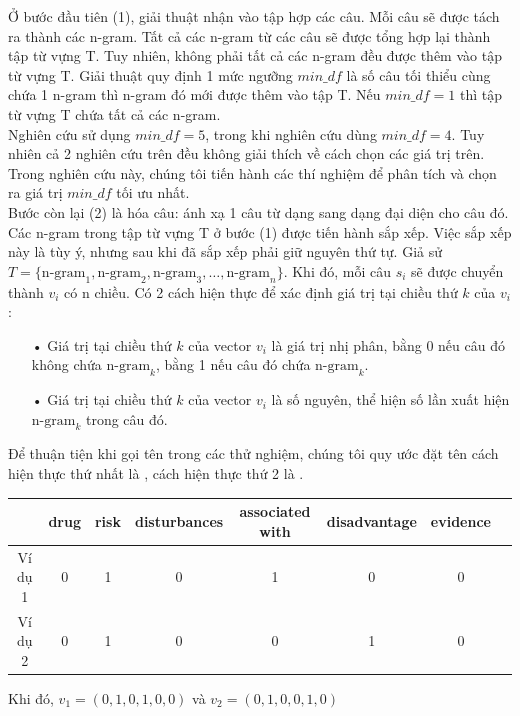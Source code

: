 Ở bước đầu tiên (1), giải thuật nhận vào tập hợp các câu. Mỗi câu sẽ được tách ra thành các n-gram. Tất cả các n-gram từ các câu sẽ được tổng hợp lại thành tập từ vựng T. Tuy nhiên, không phải tất cả các n-gram đều được thêm vào tập từ vựng T. Giải thuật quy định 1 mức ngưỡng $min\_df$ là số câu tối thiểu cùng chứa 1 n-gram thì n-gram đó mới được thêm vào tập T. Nếu $min\_df=1$ thì tập từ vựng T chứa tất cả các n-gram. \\

Nghiên cứu \cite{sarker2011outcome} sử dụng $min\_df = 5$, trong khi nghiên cứu \cite{niu2005analysis} dùng $min\_df=4$. Tuy nhiên cả 2 nghiên cứu trên đều không giải thích về cách chọn các giá trị trên. Trong nghiên cứu này, chúng tôi tiến hành các thí nghiệm để phân tích và chọn ra giá trị $min\_df$ tối ưu nhất.\\

Bước còn lại (2) là  hóa câu: ánh xạ 1 câu từ dạng  sang dạng  đại diện cho câu đó. Các n-gram trong tập từ vựng T ở bước (1) được tiến hành sắp xếp. Việc sắp xếp này là tùy ý, nhưng sau khi đã sắp xếp phải giữ nguyên thứ tự. Giả sử $T=\{\text{n-gram}_1, \text{n-gram}_2, \text{n-gram}_3, \ldots, \text{n-gram}_n\}$. Khi đó, mỗi câu $s_i$ sẽ được chuyển thành  $v_i$ có n chiều. Có 2 cách hiện thực để xác định giá trị tại chiều thứ $k$ của  $v_i$:
\begin{itemize}
\item[•] Giá trị tại chiều thứ $k$ của vector $v_i$ là giá trị nhị phân, bằng 0 nếu câu đó không chứa $\text{n-gram}_k$, bằng 1 nếu câu đó chứa $\text{n-gram}_k$.
\item[•] Giá trị tại chiều thứ $k$ của vector $v_i$ là số nguyên, thể hiện số lần xuất hiện $\text{n-gram}_k$ trong câu đó.
\end{itemize}
Để thuận tiện khi gọi tên trong các thử nghiệm, chúng tôi quy ước đặt tên cách hiện thực thứ nhất là , cách hiện thực thứ 2 là . \\
\begin{tabular}{| c | c | c | c | c | c | c | c |}
\hline
  & \textbf{drug} & \textbf{risk} & \textbf{disturbances} & \textbf{associated with} & \textbf{disadvantage} & \textbf{evidence}
\\ \hline
Ví dụ 1 & 0 & 1 & 0 & 1 & 0 & 0
\\ \hline
Ví dụ 2 & 0 & 1 & 0 & 0 & 1 & 0
\\ \hline
\end{tabular}
Khi đó, $v_1 = (0, 1, 0, 1, 0, 0) $ và $v_2=(0, 1, 0, 0, 1, 0)$
